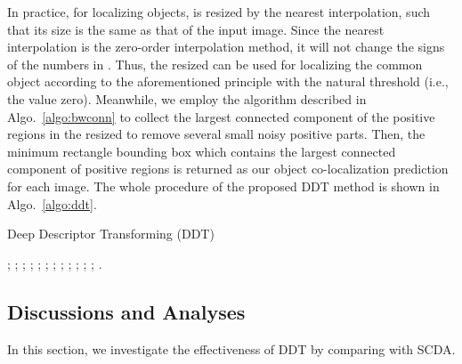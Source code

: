 \documentclass[twocolumn]{svjour3}          \smartqed  \usepackage{graphicx}
\begin{document}
In practice, for localizing objects,  is resized by the nearest interpolation, such that its size is the same as that of the input image. Since the nearest interpolation is the zero-order interpolation method, it will not change the signs of the numbers in . Thus, the resized  can be used for localizing the common object according to the aforementioned principle with the natural threshold (i.e., the value zero). Meanwhile, we employ the algorithm described in Algo.~\ref{algo:bwconn} to collect the largest connected component of the positive regions in the resized  to remove several small noisy positive parts. Then, the minimum rectangle bounding box which contains the largest connected component of positive regions is returned as our object co-localization prediction for each image. The whole procedure of the proposed DDT method is shown in Algo.~\ref{algo:ddt}.

\begin{algorithm}[t]
\caption{Deep Descriptor Transforming (DDT)}
\label{algo:ddt}
\begin{algorithmic}[1]{
;
;
;
;
;
;
;
\REPEAT
	;
	;
	;
	;
;
.
}\end{algorithmic}
\end{algorithm}

\subsection{Discussions and Analyses}

In this section, we investigate the effectiveness of DDT by comparing with SCDA.
\end{document}
